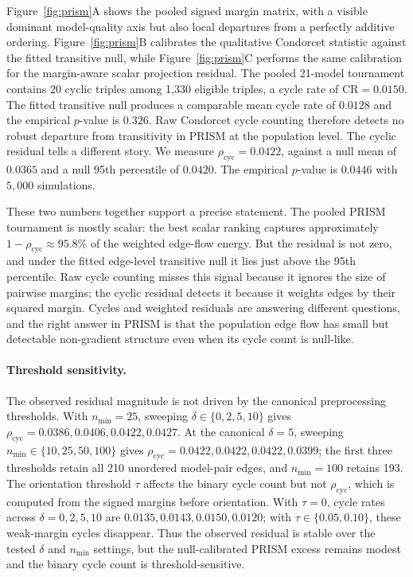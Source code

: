\documentclass[10pt]{article}
\theoremstyle{definition}
\theoremstyle{remark}
\begin{document}
Figure~\ref{fig:prism}A shows the pooled signed margin matrix, with a visible dominant model-quality axis but also local departures from a perfectly additive ordering. Figure~\ref{fig:prism}B calibrates the qualitative Condorcet statistic against the fitted transitive null, while Figure~\ref{fig:prism}C performs the same calibration for the margin-aware scalar projection residual. The pooled 21-model tournament contains 20 cyclic triples among 1,330 eligible triples, a cycle rate of $\mathrm{CR}=0.0150$. The fitted transitive null produces a comparable mean cycle rate of $0.0128$ and the empirical $p$-value is $0.326$. Raw Condorcet cycle counting therefore detects no robust departure from transitivity in PRISM at the population level. The cyclic residual tells a different story. We measure $\rho_{\mathrm{cyc}}=0.0422$, against a null mean of $0.0365$ and a null 95th percentile of $0.0420$. The empirical $p$-value is $0.0446$ with $5{,}000$ simulations.

These two numbers together support a precise statement. The pooled PRISM tournament is mostly scalar: the best scalar ranking captures approximately $1-\rho_{\mathrm{cyc}}\approx 95.8\%$ of the weighted edge-flow energy. But the residual is not zero, and under the fitted edge-level transitive null it lies just above the 95th percentile. Raw cycle counting misses this signal because it ignores the size of pairwise margins; the cyclic residual detects it because it weights edges by their squared margin. Cycles and weighted residuals are answering different questions, and the right answer in PRISM is that the population edge flow has small but detectable non-gradient structure even when its cycle count is null-like.

\paragraph{Threshold sensitivity.} The observed residual magnitude is not driven by the canonical preprocessing thresholds. With $n_{\min}=25$, sweeping $\delta\in\{0,2,5,10\}$ gives $\rho_{\mathrm{cyc}}=0.0386,0.0406,0.0422,0.0427$. At the canonical $\delta=5$, sweeping $n_{\min}\in\{10,25,50,100\}$ gives $\rho_{\mathrm{cyc}}=0.0422,0.0422,0.0422,0.0399$; the first three thresholds retain all 210 unordered model-pair edges, and $n_{\min}=100$ retains 193. The orientation threshold $\tau$ affects the binary cycle count but not $\rho_{\mathrm{cyc}}$, which is computed from the signed margins before orientation. With $\tau=0$, cycle rates across $\delta=0,2,5,10$ are $0.0135,0.0143,0.0150,0.0120$; with $\tau\in\{0.05,0.10\}$, these weak-margin cycles disappear. Thus the observed residual is stable over the tested $\delta$ and $n_{\min}$ settings, but the null-calibrated PRISM excess remains modest and the binary cycle count is threshold-sensitive.
\end{document}
